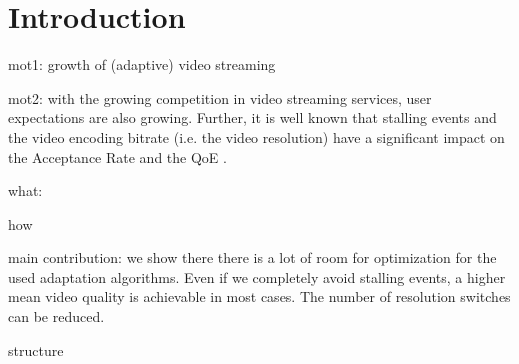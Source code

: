 
\section{Introduction}
\label{sec:introduction}

mot1: growth of (adaptive) video streaming

mot2: with the growing competition in video streaming services, user expectations are also growing. Further, it is well known that stalling events and the video encoding bitrate (i.e. the video resolution) have a significant impact on the Acceptance Rate and the QoE \cite{casas2012youtube}.

what:

how

main contribution: we show there there is a lot of room for optimization for the used adaptation algorithms. Even if we completely avoid stalling events, a higher mean video quality is achievable in most cases. The number of resolution switches can be reduced.

structure
